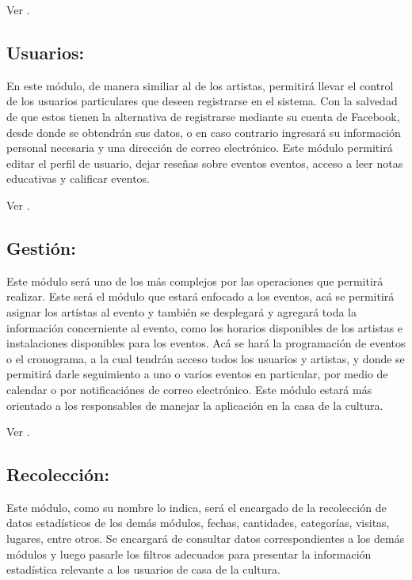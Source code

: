 \documentclass[letterpaper,11pt,spanish]{sphinxmanual}
\begin{document}
Ver {\hyperref[disenio:etiqueta1]{}}.


\subsection{Usuarios:}
\label{proyecto:usuarios}
En este módulo, de manera similiar al de los artistas, permitirá llevar el control
de los usuarios particulares que deseen registrarse en el sistema. Con la salvedad
de que estos tienen la alternativa de registrarse mediante su cuenta de Facebook,
desde donde se obtendrán sus datos, o en caso contrario ingresará su información
personal necesaria y una dirección de correo electrónico. Este módulo permitirá editar
el perfil de usuario, dejar reseñas sobre eventos eventos, acceso a leer notas educativas
y calificar eventos.

Ver {\hyperref[disenio:etiqueta2]{}}.


\subsection{Gestión:}
\label{proyecto:gestion}
Este módulo será uno de los más complejos por las operaciones que permitirá realizar.
Este será el módulo que estará enfocado a los eventos, acá se permitirá asignar los
artístas al evento y también se desplegará y agregará toda la información concerniente
al evento, como los horarios disponibles de los artistas e instalaciones disponibles para
los eventos. Acá se hará la programación de eventos o el cronograma, a la cual tendrán
acceso todos los usuarios y artistas, y donde se permitirá darle seguimiento a uno o varios
eventos en particular, por medio de calendar o por notificaciónes de correo electrónico.
Este módulo estará más orientado a los responsables de manejar la aplicación en la casa de la cultura.

Ver {\hyperref[disenio:etiqueta3]{}}.


\subsection{Recolección:}
\label{proyecto:recoleccion}
Este módulo, como su nombre lo indica, será el encargado de la recolección de datos
estadísticos de los demás módulos, fechas, cantidades, categorías, visitas, lugares, entre otros.
Se encargará de consultar datos correspondientes a los demás módulos y luego pasarle
los filtros adecuados para presentar la información estadística relevante a los usuarios
de casa de la cultura.
\end{document}
